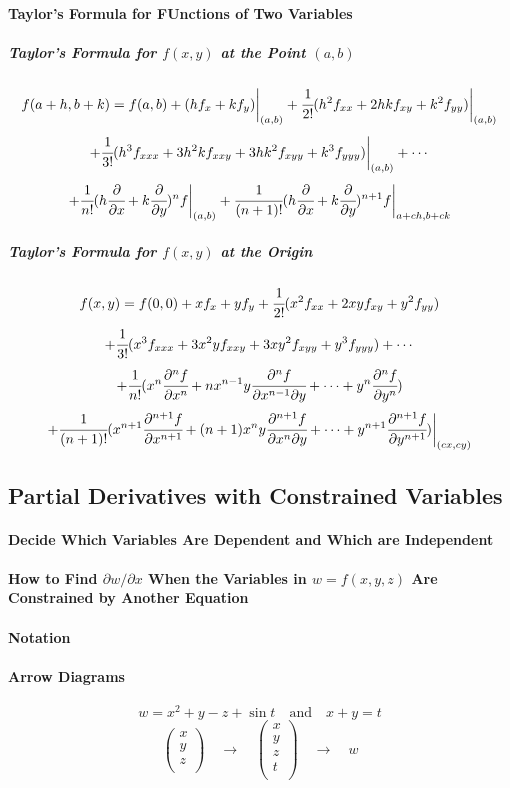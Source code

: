 \documentclass{article}
\begin{document}
            \paragraph{Taylor's Formula for FUnctions of Two Variables}
                \subparagraph{Taylor's Formula for $f(x,y)$ at the Point $(a,b)$}
                \[f(a+h,b+k)=f(a,b)+(hf_x+kf_y)\bigg|_{(a,b)}+\cfrac{1}{2!}(h^2f_{xx}+2hkf_{xy}+k^2f_{yy})\bigg|_{(a,b)}\]
                \[+\cfrac{1}{3!}(h^3f_{xxx}+3h^2kf_{xxy}+3hk^2f_{xyy}+k^3f_{yyy})\bigg|_{(a,b)}+\cdots\]
                \[+\cfrac{1}{n!}(h\cfrac{\partial}{\partial x}+k\cfrac{\partial}{\partial y})^nf\bigg|_{(a,b)}+\cfrac{1}{(n+1)!}(h\cfrac{\partial}{\partial x}+k\cfrac{\partial}{\partial y})^{n+1}f\bigg|_{a+ch,b+ck}\]
                \subparagraph{Taylor's Formula for $f(x,y)$ at the Origin}
                \[f(x,y)=f(0,0)+xf_x+yf_y+\cfrac{1}{2!}(x^2f_{xx}+2xyf_{xy}+y^2f_{yy})\]
                \[+\cfrac{1}{3!}(x^3f_{xxx}+3x^2yf_{xxy}+3xy^2f_{xyy}+y^3f_{yyy})+\cdots\]
                \[+\cfrac{1}{n!}(x^n\cfrac{\partial^nf}{\partial x^n}+nx^{n-1}y\cfrac{\partial^nf}{\partial x^{n-1}\partial y}+\cdots+y^n\cfrac{\partial ^nf}{\partial y^n})\]
                \[+\cfrac{1}{(n+1)!}(x^{n+1}\cfrac{\partial^{n+1}f}{\partial x^{n+1}}+(n+1)x^ny\cfrac{\partial^{n+1}f}{\partial x^n\partial y}+\cdots+y^{n+1}\cfrac{\partial^{n+1}f}{\partial y^{n+1}})\bigg|_{(cx,cy)}\]
        \subsection{Partial Derivatives with Constrained Variables}
            \paragraph{Decide Which Variables Are Dependent and Which are Independent}
            \paragraph{How to Find $\partial w/\partial x$ When the Variables in $w=f(x,y,z)$ Are Constrained by Another Equation}
            \paragraph{Notation}
            \paragraph{Arrow Diagrams}
            \[w=x^2+y-z+\sin t\quad\text{and}\quad x+y=t\]
            \[\begin{pmatrix}
                x\\
                y\\
                z\\
            \end{pmatrix}\quad\to\quad
            \begin{pmatrix}
                x\\
                y\\
                z\\
                t\\
            \end{pmatrix}\quad\to\quad w\]
    
\end{document}
